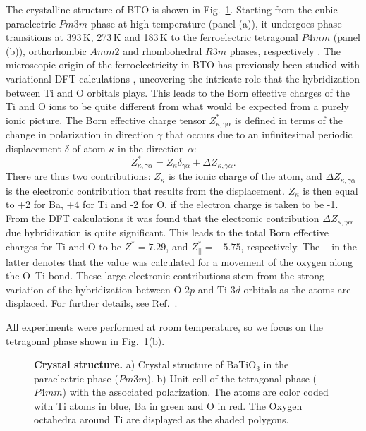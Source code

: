 The crystalline structure of BTO is shown in Fig.~\ref{fig:BTO_crystal}.
Starting from the cubic paraelectric $Pm3m$ phase at high temperature (panel (a)), it undergoes phase transitions at 393\,K, 273\,K and 183\,K to the ferroelectric tetragonal $P4mm$ (panel (b)), orthorhombic $Amm2$ and rhombohedral $R3m$ phases, respectively \cite{Mason1948, VonHippel1950, Marton2010}.
The microscopic origin of the ferroelectricity in BTO has previously been studied with variational DFT calculations \cite{Ghosez1995}, uncovering the intricate role that the hybridization between Ti and O orbitals plays.
This leads to the Born effective charges of the Ti and O ions to be quite different from what would be expected from a purely ionic picture.
The Born effective charge tensor $Z^*_{\kappa, \gamma\alpha}$ is defined in terms of the change in polarization in direction $\gamma$ that occurs due to an infinitesimal periodic displacement $\delta$ of atom $\kappa$ in the direction $\alpha$:
\begin{equation}
Z^*_{\kappa, \gamma\alpha} = Z_{\kappa} \delta_{\gamma\alpha} + \Delta Z_{\kappa, \gamma\alpha}.
\end{equation}
There are thus two contributions: $Z_{\kappa}$ is the ionic charge of the atom, and $\Delta Z_{\kappa, \gamma\alpha}$ is the electronic contribution that results from the displacement.
$Z_{\kappa}$ is then equal to +2 for Ba, +4 for Ti and -2 for O, if the electron charge is taken to be -1.
From the DFT calculations it was found that the electronic contribution $\Delta Z_{\kappa, \gamma\alpha}$ due hybridization is quite significant.
This leads to the total Born effective charges for Ti and O to be $Z^* = 7.29$, and $Z^*_{||} = -5.75$, respectively.
The $||$ in the latter denotes that the value was calculated for a movement of the oxygen along the O--Ti bond.
These large electronic contributions stem from the strong variation of the hybridization between O $2p$ and Ti $3d$ orbitals as the atoms are displaced.
For further details, see Ref.~\cite{Ghosez1995}.

All experiments were performed at room temperature, so we focus on the tetragonal phase shown in Fig.~\ref{fig:BTO_crystal}(b).
\begin{figure}[h]
	\caption{\label{fig:BTO_crystal}{\bf Crystal structure.} a) Crystal structure of BaTiO$_3$ in the paraelectric phase ($Pm3m$). b) Unit cell of the tetragonal phase ($P4mm$) with the associated polarization. The atoms are color coded with Ti atoms in blue, Ba in green and O in red. The Oxygen octahedra around Ti are displayed as the shaded polygons.}
\end{figure}

